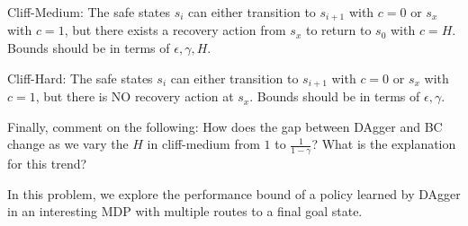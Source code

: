 \documentclass[11pt]{article}
\begin{document}
\noindent Cliff-Medium: The safe states $s_i$ can either transition to $s_{i+1}$ with $c = 0$ or $s_x$ with $c = 1$, but there exists a recovery action from $s_x$ to return to $s_0$ with $c = H$. Bounds should be in terms of $\epsilon, \gamma, H$.


\vskip 1.2in
\begin{figure}[h!]
\centering
{}
\end{figure}

\noindent Cliff-Hard: The safe states $s_i$ can either transition to $s_{i+1}$ with $c = 0$ or $s_x$ with $c = 1$, but there is NO recovery action at $s_x$. Bounds should be in terms of $\epsilon, \gamma$.


Finally, comment on the following: How does the gap between DAgger and BC change as we vary the $H$ in cliff-medium from $1$ to $\frac{1}{1-\gamma}$? What is the explanation for this trend?
\newpage



\noindent In this problem, we explore the performance bound of a policy learned by DAgger in an interesting MDP with multiple routes to a final goal state.
\end{document}
